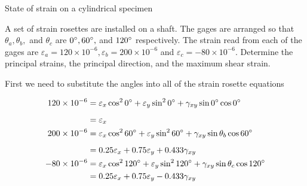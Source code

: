 \documentclass[
fontsize=10pt,
a4paper,
twosides=false,
open=any,
svgnames,
]{kaobook} %
\begin{document}
\begin{example} State of strain on a cylindrical specimen

  A set of strain rosettes are installed on a shaft. The gages are arranged so that $\theta_a, \theta_b,$ and $\theta_c$ are $0\degree, 60\degree,$ and $120\degree$ respectively. The strain read from each of the gages are $\varepsilon_a = 120 \times 10^{-6}, \varepsilon_b = 200 \times 10^{-6}$ and $\varepsilon_c = -80 \times 10^{-6}$. Determine the principal strains, the principal direction, and the maximum shear strain.

  \begin{figure}[H]
  \centering
\end{figure}

  First we need to substitute the angles into all of the strain rosette equations

  \begin{align*}
    120 \times 10^{-6} &= \varepsilon_x \cos^2 0\degree + \varepsilon_y \sin^2 0\degree + \gamma_{xy} \sin 0\degree \cos 0\degree \\[5pt]
                       &= \varepsilon_x \\
    200 \times 10^{-6} &= \varepsilon_x \cos^2 60\degree + \varepsilon_y \sin^2 60\degree + \gamma_{xy} \sin \theta_b \cos 60\degree \\[5pt]
                       &= 0.25\varepsilon_x + 0.75\varepsilon_y + 0.433\gamma_{xy} \\
    -80 \times 10^{-6} &= \varepsilon_x \cos^2 120\degree + \varepsilon_y \sin^2 120\degree + \gamma_{xy} \sin \theta_c \cos 120\degree \\
                       &= 0.25\varepsilon_x + 0.75\varepsilon_y -0.433\gamma_{xy}
  \end{align*}


\end{example}
\end{document}
